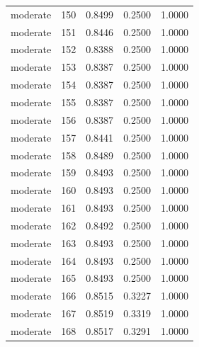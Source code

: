 \begin{tabular}{lrrrr}
moderate & 150 & 0.8499 & 0.2500 & 1.0000 \\
moderate & 151 & 0.8446 & 0.2500 & 1.0000 \\
moderate & 152 & 0.8388 & 0.2500 & 1.0000 \\
moderate & 153 & 0.8387 & 0.2500 & 1.0000 \\
moderate & 154 & 0.8387 & 0.2500 & 1.0000 \\
moderate & 155 & 0.8387 & 0.2500 & 1.0000 \\
moderate & 156 & 0.8387 & 0.2500 & 1.0000 \\
moderate & 157 & 0.8441 & 0.2500 & 1.0000 \\
moderate & 158 & 0.8489 & 0.2500 & 1.0000 \\
moderate & 159 & 0.8493 & 0.2500 & 1.0000 \\
moderate & 160 & 0.8493 & 0.2500 & 1.0000 \\
moderate & 161 & 0.8493 & 0.2500 & 1.0000 \\
moderate & 162 & 0.8492 & 0.2500 & 1.0000 \\
moderate & 163 & 0.8493 & 0.2500 & 1.0000 \\
moderate & 164 & 0.8493 & 0.2500 & 1.0000 \\
moderate & 165 & 0.8493 & 0.2500 & 1.0000 \\
moderate & 166 & 0.8515 & 0.3227 & 1.0000 \\
moderate & 167 & 0.8519 & 0.3319 & 1.0000 \\
moderate & 168 & 0.8517 & 0.3291 & 1.0000 \\
\bottomrule
\end{tabular}
